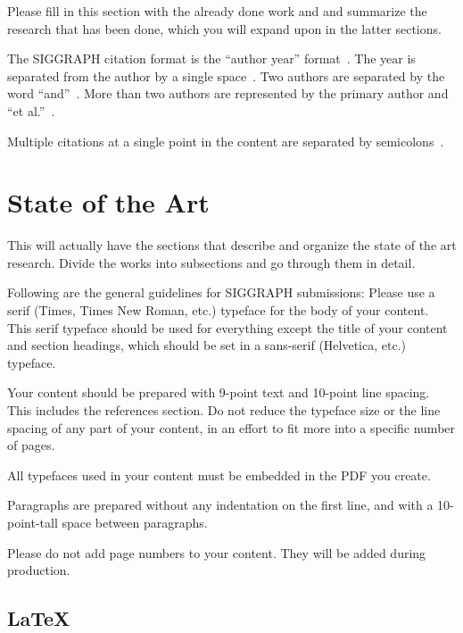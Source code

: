 \documentclass[tog]{acmsiggraph}
\begin{document}
Please fill in this section with the already done work and and summarize the research that has been done, which you will expand upon in the latter sections.

The SIGGRAPH citation format is the ``author year''
format~\cite{Pellacini:2005:LAH}. The year is separated from the
author by a single space~\cite{yee:2000:ssa}. Two authors are
separated by the word ``and''~\cite{parke:1996:CFA}. More than two
authors are represented by the primary author and ``et al.''~\cite{levoy:2000:TDM}.

Multiple citations at a single point in the content are separated by
semicolons~\cite{levoy:2000:TDM,sako:2001:SSB}.


\section{State of the Art}

This will actually have the sections that describe and organize the state of the art research.
Divide the works into subsections and go through them in detail.

Following are the general guidelines for SIGGRAPH submissions:
Please use a serif (Times, Times New Roman, etc.) typeface for the
body of your content. This serif typeface should be used for
everything except the title of your content and section headings,
which should be set in a sans-serif (Helvetica, etc.) typeface.

Your content should be prepared with 9-point text and 10-point line
spacing. This includes the references section. Do not reduce the
typeface size or the line spacing of any part of your content, in an
effort to fit more into a specific number of pages. 

All typefaces used in your content must be embedded in the PDF you
create. 

Paragraphs are prepared without any indentation on the first line, and
with a 10-point-tall space between paragraphs.

Please do not add page numbers to your content. They will be added
during production.






\subsection{\LaTeX}
\end{document}
